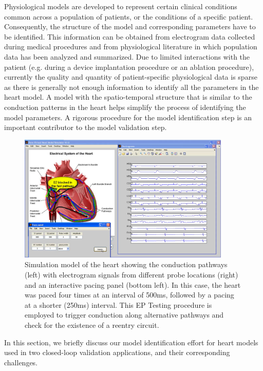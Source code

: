 Physiological models are developed to represent certain clinical conditions common across a population of patients, or the conditions of a specific patient. 
Consequently, the structure of the model and corresponding parameters have to be identified. 
This information can be obtained from electrogram data collected during medical procedures and from physiological literature in which population data has been analyzed and summarized. 
Due to limited interactions with the patient (e.g. during a device implantation procedure or an ablation procedure), currently the quality and quantity of patient-specific physiological data is sparse as there is generally not enough information to identify all the parameters in the heart model.  
A model with the spatio-temporal structure that is similar to the conduction patterns in the heart helps simplify the process of identifying the model parameters. 
A rigorous procedure for the model identification step is an important contributor to the model validation step. 
\begin{figure}[t]
\center
	\includegraphics[width=0.9\textwidth]{figs/vhmsim.png}
	\caption{Simulation model of the heart showing the conduction pathways (left) with electrogram signals from different probe locations (right) and an interactive pacing panel (bottom left). In this case, the heart was paced four times at an interval of 500ms, followed by a pacing at a shorter (250ms) interval. This EP Testing procedure is employed to trigger conduction along alternative pathways and check for the existence of a reentry circuit.}
	\label{fig:vhmsim}
\end{figure}
In this section, we briefly discuss our model identification effort for heart models used in two closed-loop validation applications, and their corresponding challenges. 

